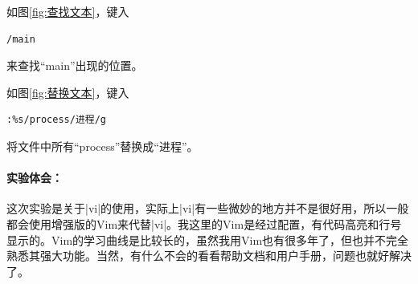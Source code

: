 \documentclass[cs4size,a4paper,nofonts]{ctexart}
\begin{document}
如图\ref{fig:查找文本}，键入
\begin{Verbatim}
/main
\end{Verbatim}
来查找“main”出现的位置。

如图\ref{fig:替换文本}，键入
\begin{Verbatim}
:%s/process/进程/g
\end{Verbatim}
将文件中所有“process”替换成“进程”。

\vspace*{1em}

\paragraph{实验体会：}\quad

这次实验是关于|vi|的使用，实际上|vi|有一些微妙的地方并不是很好用，所以一般都会使用增强版的Vim来代替|vi|。我这里的Vim是经过配置，有代码高亮和行号显示的。Vim的学习曲线是比较长的，虽然我用Vim也有很多年了，但也并不完全熟悉其强大功能。当然，有什么不会的看看帮助文档和用户手册，问题也就好解决了。
\end{document}
